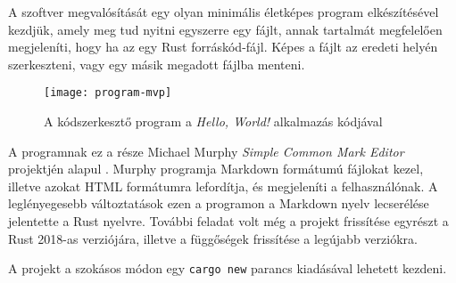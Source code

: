 
\graphicspath{{./kepek/}}


A szoftver megvalósítását egy olyan minimális életképes program elkészítésével kezdjük,
amely meg tud nyitni egyszerre egy fájlt, annak tartalmát megfelelően megjeleníti,
hogy ha az egy Rust forráskód-fájl. Képes a fájlt az eredeti helyén szerkeszteni, vagy egy másik megadott fájlba menteni.

\begin{figure}[h!]
    \centering
    \texttt{[image: program-mvp]}
    \caption{A kódszerkesztő program a \textit{Hello, World!} alkalmazás kódjával}
	\label{fig:program-mvp}
\end{figure}

A programnak ez a része Michael Murphy \textit{Simple Common Mark Editor} projektjén alapul \cite{gtk_tutorial}.
Murphy programja Markdown formátumú fájlokat kezel, illetve azokat HTML formátumra lefordítja,
és megjeleníti a felhasználónak.
A leglényegesebb változtatások ezen a programon a Markdown nyelv lecserélése jelentette a Rust nyelvre.
További feladat volt még a projekt frissítése egyrészt a Rust 2018-as verziójára, illetve a függőségek frissítése a legújabb verziókra.

A projekt a szokásos módon egy \texttt{cargo new} parancs kiadásával lehetett kezdeni.



